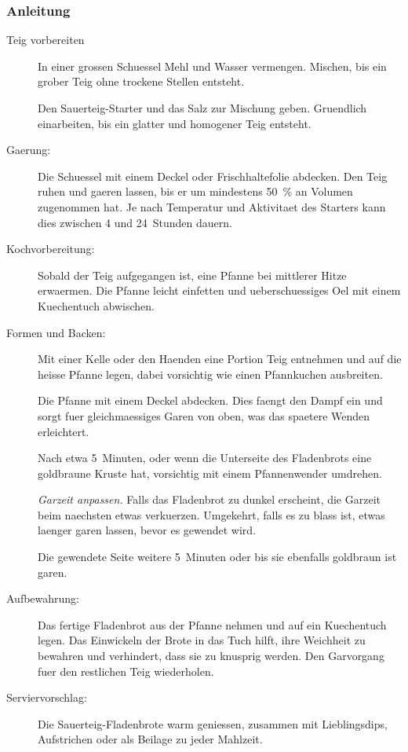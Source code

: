 \subsubsection*{Anleitung}
\begin{description}
\item[Teig vorbereiten] In einer grossen Schuessel Mehl und Wasser vermengen.
    Mischen, bis ein grober Teig ohne trockene Stellen entsteht.

    Den Sauerteig-Starter und das Salz zur Mischung geben. Gruendlich
    einarbeiten, bis ein glatter und homogener Teig entsteht.

\item[Gaerung:] Die Schuessel mit einem Deckel oder Frischhaltefolie abdecken.
    Den Teig ruhen und gaeren lassen, bis er um mindestens \qty{50}{\percent}
    an Volumen zugenommen hat. Je nach Temperatur und Aktivitaet des Starters
    kann dies zwischen 4 und 24~Stunden dauern.

\item[Kochvorbereitung:] Sobald der Teig aufgegangen ist, eine Pfanne bei
    mittlerer Hitze erwaermen. Die Pfanne leicht einfetten und ueberschuessiges
    Oel mit einem Kuechentuch abwischen.

\item[Formen und Backen:] Mit einer Kelle oder den Haenden eine Portion Teig
    entnehmen und auf die heisse Pfanne legen, dabei vorsichtig wie einen
    Pfannkuchen ausbreiten.

    Die Pfanne mit einem Deckel abdecken. Dies faengt den Dampf ein und
    sorgt fuer gleichmaessiges Garen von oben, was das spaetere Wenden
    erleichtert.

    Nach etwa 5~Minuten, oder wenn die Unterseite des Fladenbrots eine
    goldbraune Kruste hat, vorsichtig mit einem Pfannenwender umdrehen.

    \emph{Garzeit anpassen.} Falls das Fladenbrot zu dunkel erscheint, die
    Garzeit beim naechsten etwas verkuerzen. Umgekehrt, falls es zu blass ist,
    etwas laenger garen lassen, bevor es gewendet wird.

    Die gewendete Seite weitere 5~Minuten oder bis sie ebenfalls goldbraun ist
    garen.

\item[Aufbewahrung:] Das fertige Fladenbrot aus der Pfanne nehmen und auf ein
    Kuechentuch legen. Das Einwickeln der Brote in das Tuch hilft, ihre
    Weichheit zu bewahren und verhindert, dass sie zu knusprig werden. Den
    Garvorgang fuer den restlichen Teig wiederholen.

\item[Serviervorschlag:] Die Sauerteig-Fladenbrote warm geniessen, zusammen
    mit Lieblingsdips, Aufstrichen oder als Beilage zu jeder Mahlzeit.

\end{description}
